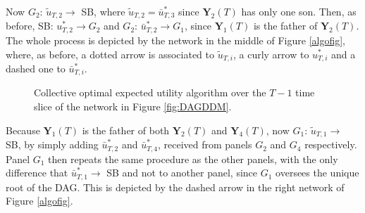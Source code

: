 \begin{example}
Now $G_2$: $\tilde{u}_{T,2}\longrightarrow$ SB, where $\tilde{u}_{T,2}=\bar{u}_{T,3}^*$ since $\bm{Y}_2(T)$ has only one son. Then, as before, SB: $u^*_{T,2}
\longrightarrow G_2$  and $ G_2$: $\bar{u}^*_{T,2}\longrightarrow G_1$, since $\bm{Y}_1(T)$ is the father of $\bm{Y}_2(T)$.  The whole process is depicted by the network in the middle of Figure \ref{algofig}, where, as before, a dotted arrow is associated to $\tilde{u}_{T,i}$, a curly arrow to $u^*_{T,i}$ and a dashed one to $\bar{u}^*_{T,i}$. 

\begin{figure}
\centerline{
}
\caption{Collective optimal expected utility algorithm over the $T-1$ time slice of the network in Figure \ref{fig:DAGDDM}. \label{algofig2}}
\end{figure}

Because $\bm{Y}_1(T)$ is the  father of both $\bm{Y}_2(T)$ and $\bm{Y}_4(T)$, now  $G_1$: $\tilde{u}_{T,1}\longrightarrow$ SB, by simply adding $\bar{u}^*_{T,2}$ and $\bar{u}^*_{T,4}$, received from panels $G_2$ and $G_4$ respectively. Panel $G_1$ then repeats the same procedure as the other panels, with the only difference that  $ \bar{u}^*_{T,1}\longrightarrow$ SB and not to another panel, since $G_1$ oversees the unique root of the DAG. This is depicted by the dashed arrow in the right network of Figure \ref{algofig}. 




\end{example}
